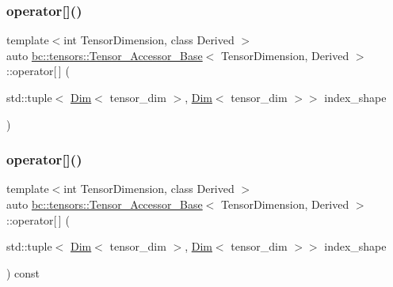 \subsubsection{\texorpdfstring{operator[]()}{operator[]()}\hspace{0.1cm}{\footnotesize\ttfamily [5/6]}}
{\footnotesize\ttfamily template$<$int Tensor\+Dimension, class Derived $>$ \\
auto \hyperlink{classbc_1_1tensors_1_1Tensor__Accessor__Base}{bc\+::tensors\+::\+Tensor\+\_\+\+Accessor\+\_\+\+Base}$<$ Tensor\+Dimension, Derived $>$\+::operator\mbox{[}$\,$\mbox{]} (\begin{DoxyParamCaption}\item[{std\+::tuple$<$ \hyperlink{structbc_1_1Dim}{Dim}$<$ tensor\+\_\+dim $>$, \hyperlink{structbc_1_1Dim}{Dim}$<$ tensor\+\_\+dim $>$$>$}]{index\+\_\+shape }\end{DoxyParamCaption})\hspace{0.3cm}{\ttfamily [inline]}}

\mbox{\label{classbc_1_1tensors_1_1Tensor__Accessor__Base_a6812235dd5b7a9b88eaa03d382e4bc11}} 
\subsubsection{\texorpdfstring{operator[]()}{operator[]()}\hspace{0.1cm}{\footnotesize\ttfamily [6/6]}}
{\footnotesize\ttfamily template$<$int Tensor\+Dimension, class Derived $>$ \\
auto \hyperlink{classbc_1_1tensors_1_1Tensor__Accessor__Base}{bc\+::tensors\+::\+Tensor\+\_\+\+Accessor\+\_\+\+Base}$<$ Tensor\+Dimension, Derived $>$\+::operator\mbox{[}$\,$\mbox{]} (\begin{DoxyParamCaption}\item[{std\+::tuple$<$ \hyperlink{structbc_1_1Dim}{Dim}$<$ tensor\+\_\+dim $>$, \hyperlink{structbc_1_1Dim}{Dim}$<$ tensor\+\_\+dim $>$$>$}]{index\+\_\+shape }\end{DoxyParamCaption}) const\hspace{0.3cm}{\ttfamily [inline]}}


